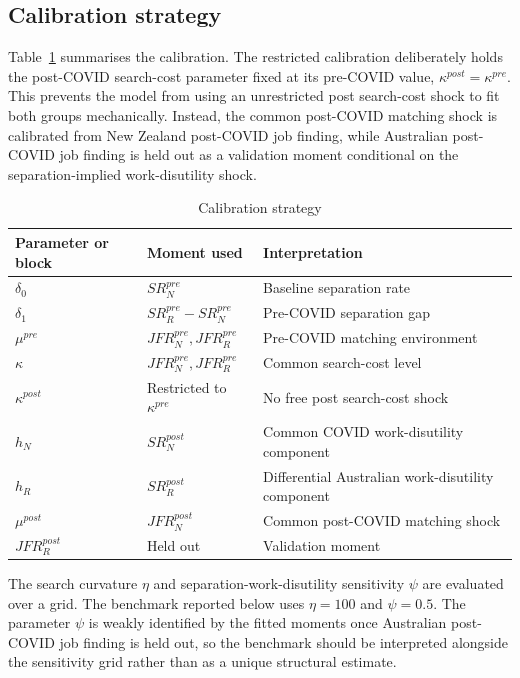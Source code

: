 \subsection{Calibration strategy}

Table~\ref{tab:model_calibration_strategy_14} summarises the calibration. The restricted calibration deliberately holds the post-COVID search-cost parameter fixed at its pre-COVID value, $\kappa^{post}=\kappa^{pre}$. This prevents the model from using an unrestricted post search-cost shock to fit both groups mechanically. Instead, the common post-COVID matching shock is calibrated from New Zealand post-COVID job finding, while Australian post-COVID job finding is held out as a validation moment conditional on the separation-implied work-disutility shock.

\begin{table}[htbp]
    \centering
    \caption{Calibration strategy}
    \label{tab:model_calibration_strategy_14}
    \begin{tabular}{lll}
        \toprule
        Parameter or block & Moment used & Interpretation \\
        \midrule
        $\delta_0$ & $SR_N^{pre}$ & Baseline separation rate \\
        $\delta_1$ & $SR_R^{pre}-SR_N^{pre}$ & Pre-COVID separation gap \\
        $\mu^{pre}$ & $JFR_N^{pre},JFR_R^{pre}$ & Pre-COVID matching environment \\
        $\kappa$ & $JFR_N^{pre},JFR_R^{pre}$ & Common search-cost level \\
        $\kappa^{post}$ & Restricted to $\kappa^{pre}$ & No free post search-cost shock \\
        $h_N$ & $SR_N^{post}$ & Common COVID work-disutility component \\
        $h_R$ & $SR_R^{post}$ & Differential Australian work-disutility component \\
        $\mu^{post}$ & $JFR_N^{post}$ & Common post-COVID matching shock \\
        $JFR_R^{post}$ & Held out & Validation moment \\
        \bottomrule
    \end{tabular}
\end{table}

The search curvature $\eta$ and separation-work-disutility sensitivity $\psi$ are evaluated over a grid. The benchmark reported below uses $\eta=100$ and $\psi=0.5$. The parameter $\psi$ is weakly identified by the fitted moments once Australian post-COVID job finding is held out, so the benchmark should be interpreted alongside the sensitivity grid rather than as a unique structural estimate.

